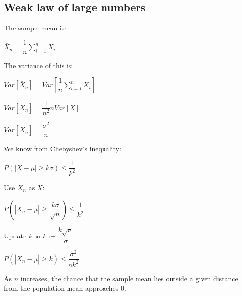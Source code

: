 
\subsection{Weak law of large numbers}

The sample mean is:

\(\bar X_n=\dfrac{1}{n}\sum_{i=1}^nX_i\)

The variance of this is:

\(Var[\bar X_n]=Var[\dfrac{1}{n}\sum_{i=1}^nX_i]\)

\(Var[\bar X_n]=\dfrac{1}{n^2}nVar[X]\)

\(Var[\bar X_n]=\dfrac{\sigma^2}{n} \)

We know from Chebyshev’s inequality:

\(P(|X-\mu | \ge k\sigma )\le \dfrac{1}{k^2}\)

Use \(\bar X_n\) as \(X\):

\(P(|\bar X_n-\mu | \ge \dfrac{k\sigma }{\sqrt n})\le \dfrac{1}{k^2}\)

Update \(k\) so \(k:=\dfrac{k\sqrt n}{\sigma}\)

\(P(|\bar X_n-\mu | \ge k)\le \dfrac{\sigma^2}{nk^2}\)

As \(n\) increases, the chance that the sample mean lies outside a given distance from the population mean approaches \(0\).

